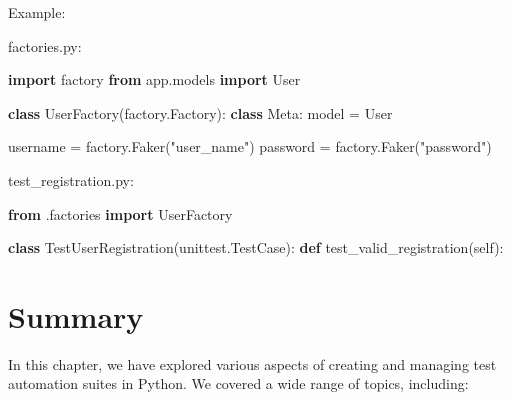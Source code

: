 \documentclass[
  paper=a4,
  ,captions=tableheading
]{scrartcl}
\newenvironment{Shaded}{}{}
\newcommand{\ImportTok}[1]{\textcolor[rgb]{0.00,0.50,0.00}{\textbf{#1}}}
\newcommand{\KeywordTok}[1]{\textcolor[rgb]{0.00,0.44,0.13}{\textbf{#1}}}
\newcommand{\NormalTok}[1]{#1}
\newcommand{\OperatorTok}[1]{\textcolor[rgb]{0.40,0.40,0.40}{#1}}
\newcommand{\StringTok}[1]{\textcolor[rgb]{0.25,0.44,0.63}{#1}}
\newcommand{\VariableTok}[1]{\textcolor[rgb]{0.10,0.09,0.49}{#1}}
\begin{document}
Example:

factories.py:

\begin{Shaded}
\begin{Highlighting}[]
\ImportTok{import}\NormalTok{ factory}
\ImportTok{from}\NormalTok{ app.models }\ImportTok{import}\NormalTok{ User}

\KeywordTok{class}\NormalTok{ UserFactory(factory.Factory):}
    \KeywordTok{class}\NormalTok{ Meta:}
\NormalTok{        model }\OperatorTok{=}\NormalTok{ User}

\NormalTok{    username }\OperatorTok{=}\NormalTok{ factory.Faker(}\StringTok{"user\_name"}\NormalTok{)}
\NormalTok{    password }\OperatorTok{=}\NormalTok{ factory.Faker(}\StringTok{"password"}\NormalTok{)}
\end{Highlighting}
\end{Shaded}

test\_registration.py:

\begin{Shaded}
\begin{Highlighting}[]
\ImportTok{from}\NormalTok{ .factories }\ImportTok{import}\NormalTok{ UserFactory}

\KeywordTok{class}\NormalTok{ TestUserRegistration(unittest.TestCase):}
    \KeywordTok{def}\NormalTok{ test\_valid\_registration(}\VariableTok{self}\NormalTok{):}
\end{Highlighting}
\end{Shaded}

\hypertarget{summary-5}{%
\section{Summary}\label{summary-5}}

In this chapter, we have explored various aspects of creating and
managing test automation suites in Python. We covered a wide range of
topics, including:
\end{document}
